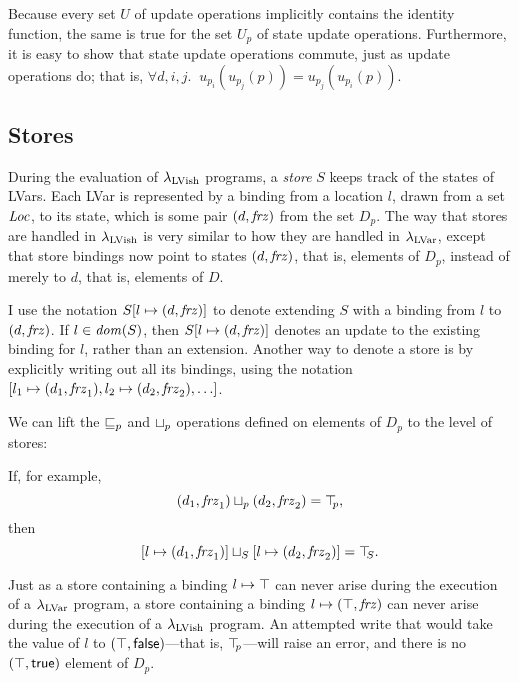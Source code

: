 \DefSetOfStateUpdateOperations

Because every set $U$ of update operations implicitly contains the
identity function, the same is true for the set $U_p$ of state update
operations.  Furthermore, it is easy to show that state update
operations commute, just as update operations do; that is, $\forall d,
i, j.  \;\; u_{p_i}(u_{p_j}(p)) = u_{p_j}(u_{p_i}(p))$. 

\subsection{Stores}

During the evaluation of $\lambda_{\textrm{LVish}}$ programs, a \emph{store} $S$
keeps track of the states of LVars.  Each LVar is represented by a
binding from a location $l$, drawn from a set $\mathit{Loc}$, to its state,
which is some pair $(d, \mathit{frz})$ from the set $D_p$.  The way
that stores are handled in $\lambda_{\textrm{LVish}}$ is very similar to how they
are handled in $\lambda_{\textrm{LVar}}$, except that store bindings now point to
states $(d, \mathit{frz})$, that is, elements of $D_p$, instead of
merely to $d$, that is, elements of $D$.

\DefStore

I use the notation $S[l \mapsto (d, \mathit{frz})]$ to denote extending $S$
with a binding from $l$ to $(d, \mathit{frz})$.  If $l \in \mathit{dom}(S)$,
then $S[l \mapsto (d, \mathit{frz})]$ denotes an update to the existing
binding for $l$, rather than an extension.  Another way to denote a
store is by explicitly writing out all its bindings, using the
notation $\store{\storebinding{l_1}{d_1}{\status_1},
  \storebinding{l_2}{d_2}{\status_2}, \dots}$.

We can lift the $\sqsubseteq_p$ and $ \sqcup_p $ operations defined on elements
of $D_p$ to the level of stores:

\DefLeqStore

\DefLubStore

If, for example,
\[ (d_1, \mathit{frz}_1) \sqcup_p (d_2, \mathit{frz}_2) = \top\hspace{-0.85mm}_{p}, \]
then
\[ \left[ l \mapsto (d_1, \mathit{frz}_1) \right] \sqcup_{S} \left[ l \mapsto (d_2, \mathit{frz}_2) \right] =
\top\hspace{-0.85mm}_{S}. \]

Just as a store containing a binding $l \mapsto \top$ can
never arise during the execution of a $\lambda_{\textrm{LVar}}$ program, a store
containing a binding $l \mapsto (\top, \mathit{frz})$ can never arise
during the execution of a $\lambda_{\textrm{LVish}}$ program. An attempted write
that would take the value of $l$ to
$(\top, \textsf{false})$---that is, $\top\hspace{-0.85mm}_{p}$---will raise an error,
and there is no $(\top, \textsf{true})$ element of $D_p$.

